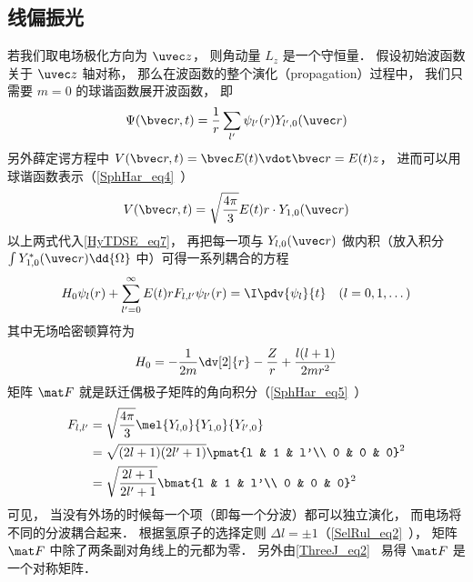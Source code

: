 \subsection{线偏振光}
若我们取电场极化方向为 $\uvec z$， 则角动量 $L_z$ 是一个守恒量． 假设初始波函数关于 $\uvec z$ 轴对称， 那么在波函数的整个演化（propagation）过程中， 我们只需要 $m=0$ 的球谐函数展开波函数， 即
\begin{equation}
\Psi(\bvec r, t) = \frac{1}{r}\sum_{l'} \psi_{l'}(r) Y_{l', 0}(\uvec r)
\end{equation}
另外薛定谔方程中 $V(\bvec r, t) = \bvec E(t) \vdot \bvec r = E(t) z$， 进而可以用球谐函数表示（\autoref{SphHar_eq4}~）
\begin{equation}
V(\bvec r, t) = \sqrt{\frac{4\pi}{3}} E(t) r \cdot Y_{1,0}(\uvec r)
\end{equation}
以上两式代入\autoref{HyTDSE_eq7}， 再把每一项与 $Y_{l,0}(\uvec r)$ 做内积（放入积分 $\int Y_{1,0}^*(\uvec r) \dd{\Omega}$ 中）可得一系列耦合的方程
\begin{equation}\label{HyTDSE_eq4}
H_0 \psi_{l}(r) + \sum_{l' = 0}^{\infty} E(t)rF_{l, l'} \psi_{l'}(r) = \I \pdv{\psi_{l}}{t} \quad (l=0,1,\dots)
\end{equation}
其中无场哈密顿算符为
\begin{equation}
H_0 = -\frac{1}{2m} \dv[2]{r} -\frac{Z}{r} + \frac{l(l+1)}{2mr^2}
\end{equation}
矩阵 $\mat F$ 就是跃迁偶极子矩阵的角向积分（\autoref{SphHar_eq5}~）
\begin{equation}
\begin{aligned}
F_{l,l'} &= \sqrt{\frac{4\pi}{3}} \mel{Y_{l,0}}{Y_{1,0}}{Y_{l',0}}\\
&= \sqrt{(2l+1)(2l'+1)} \pmat{l & 1 & l'\\ 0 & 0 & 0}^2\\
&= \sqrt{\frac{2l+1}{2l'+1}} \bmat{l & 1 & l'\\ 0 & 0 & 0}^2
\end{aligned}
\end{equation}
可见， 当没有外场的时候每一个项（即每一个分波）都可以独立演化， 而电场将不同的分波耦合起来． 根据氢原子的选择定则 $\Delta l = \pm 1$（\autoref{SelRul_eq2}~）， 矩阵 $\mat F$ 中除了两条副对角线上的元都为零． 另外由\autoref{ThreeJ_eq2}~ 易得 $\mat F$ 是一个对称矩阵．

